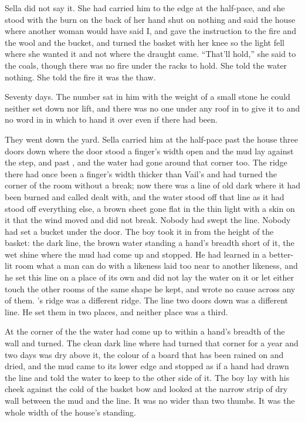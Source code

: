 Sella did not say it. She had carried him to the edge at the half-pace, and she stood with the burn on the back of her hand shut on nothing and said the house where another woman would have said I, and gave the instruction to the fire and the wool and the bucket, and turned the basket with her knee so the light fell where she wanted it and not where the draught came. “That'll hold,” she said to the coals, though there was no fire under the racks to hold. She told the water nothing. She told the fire it was the thaw.

Seventy days. The number sat in him with the weight of a small stone he could neither set down nor lift, and there was no one under any roof in  to give it to and no word in  in which to hand it over even if there had been.

\scenebreak

They went down the yard. Sella carried him at the half-pace past the house three doors down where the door stood a finger's width open and the mud lay against the step, and past , and the water had gone around that corner too. The ridge there had once been a finger's width thicker than Vail's and had turned the corner of the room without a break; now there was a line of old dark where it had been burned and called dealt with, and the water stood off that line as it had stood off everything else, a brown sheet gone flat in the thin light with a skin on it that the wind moved and did not break. Nobody had swept the line. Nobody had set a bucket under the door. The boy took it in from the height of the basket: the dark line, the brown water standing a hand's breadth short of it, the wet shine where the mud had come up and stopped. He had learned in a better-lit room what a man can do with a likeness laid too near to another likeness, and he set this line on a place of its own and did not lay the water on it or let either touch the other rooms of the same shape he kept, and wrote no cause across any of them. 's ridge was a different ridge. The line two doors down was a different line. He set them in two places, and neither place was a third.

At the corner of the  the water had come up to within a hand's breadth of the wall and turned. The clean dark line where  had turned that corner for a year and two days was dry above it, the colour of a board that has been rained on and dried, and the mud came to its lower edge and stopped as if a hand had drawn the line and told the water to keep to the other side of it. The boy lay with his cheek against the cold of the basket bow and looked at the narrow strip of dry wall between the mud and the line. It was no wider than two thumbs. It was the whole width of the house's standing.

